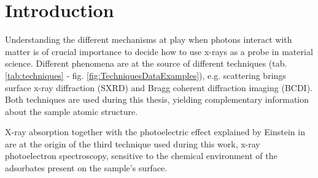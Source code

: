 \section{Introduction}

Understanding the different mechanisms at play when photons interact with matter is of crucial importance to decide how to use x-rays as a probe in material science.
Different phenomena are at the source of different techniques (tab. \ref{tab:techniques} - fig. \ref{fig:TechniquesDataExamples}), e.g. scattering brings surface x-ray diffraction (SXRD) and Bragg coherent diffraction imaging (BCDI).
Both techniques are used during this thesis, yielding complementary information about the sample atomic structure.

X-ray absorption together with the photoelectric effect explained by Einstein in \cite*{Einstein1905} are at the origin of the third technique used during this work, x-ray photoelectron spectroscopy, sensitive to the chemical environment of the adsorbates present on the sample's surface.

\begin{table}[!htb]
\centering
{}
    \caption{
        X-ray techniques carried out in the frame of this thesis.
    }
    \label{tab:techniques}
\end{table}

